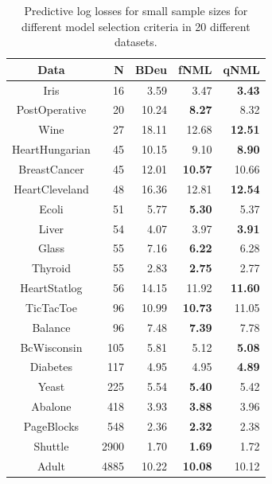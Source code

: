 \begin{table}
\centering
\begin{tabular}{crrrr}
\toprule
           Data &     N &   BDeu &            fNML &            qNML \\
\midrule
           Iris &    16 &   3.59 &            3.47 &   \textbf{3.43} \\
  PostOperative &    20 &  10.24 &   \textbf{8.27} &            8.32 \\
           Wine &    27 &  18.11 &           12.68 &  \textbf{12.51} \\
 HeartHungarian &    45 &  10.15 &            9.10 &   \textbf{8.90} \\
   BreastCancer &    45 &  12.01 &  \textbf{10.57} &           10.66 \\
 HeartCleveland &    48 &  16.36 &           12.81 &  \textbf{12.54} \\
          Ecoli &    51 &   5.77 &   \textbf{5.30} &            5.37 \\
          Liver &    54 &   4.07 &            3.97 &   \textbf{3.91} \\
          Glass &    55 &   7.16 &   \textbf{6.22} &            6.28 \\
        Thyroid &    55 &   2.83 &   \textbf{2.75} &            2.77 \\
   HeartStatlog &    56 &  14.15 &           11.92 &  \textbf{11.60} \\
      TicTacToe &    96 &  10.99 &  \textbf{10.73} &           11.05 \\
        Balance &    96 &   7.48 &   \textbf{7.39} &            7.78 \\
    BcWisconsin &   105 &   5.81 &            5.12 &   \textbf{5.08} \\
       Diabetes &   117 &   4.95 &            4.95 &   \textbf{4.89} \\
          Yeast &   225 &   5.54 &   \textbf{5.40} &            5.42 \\
        Abalone &   418 &   3.93 &   \textbf{3.88} &            3.96 \\
     PageBlocks &   548 &   2.36 &   \textbf{2.32} &            2.38 \\
        Shuttle &  2900 &   1.70 &   \textbf{1.69} &            1.72 \\
          Adult &  4885 &  10.22 &  \textbf{10.08} &           10.12 \\
\bottomrule
\end{tabular}
\caption{Predictive log losses for small sample sizes for different model selection criteria in 20 different datasets.}
\label{tbl:preds}
	\end{table}

